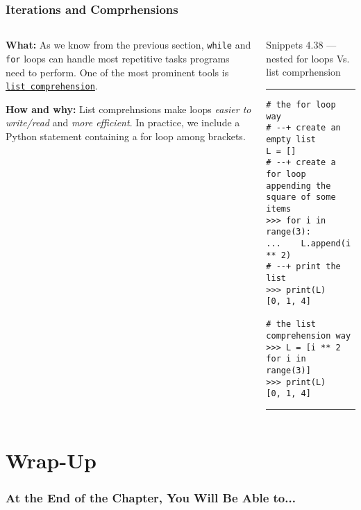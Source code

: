 \documentclass[aspectratio=1610]{beamer}
\begin{document}
\begin{frame}[fragile]
    \frametitle{Iterations and Comprhensions}
        \begin{columns}
            \begin{column}{0.35\textwidth}
            \quad \textbf{What:} 
            As we know from the previous section, \texttt{while} and \texttt{for} loops can handle most repetitive tasks programs need to perform.  One of the most prominent tools is \href{https://docs.python.org/3/tutorial/datastructures.html}{\texttt{list comprehension}}.

            \vspace{1em}
        
            \quad \textbf{How and why:}
            List comprehnsions make loops \emph{easier to write/read} and \emph{more efficient}. In practice, we include a Python statement containing a for loop among brackets.
            \end{column}
            \begin{column}{0.55\textwidth}
            Snippets 4.38 --- nested for loops Vs. list comprhension
            \rule{\textwidth}{1pt}
                \scriptsize
                \begin{verbatim} 
# the for loop way
# --+ create an empty list
L = []
# --+ create a for loop appending the square of some items
>>> for i in range(3):
...    L.append(i ** 2)
# --+ print the list
>>> print(L)
[0, 1, 4]

# the list comprehension way
>>> L = [i ** 2 for i in range(3)]
>>> print(L)
[0, 1, 4]
               \end{verbatim}
           \rule{\textwidth}{1pt}
           \end{column}
    \end{columns}
\end{frame}

\section{Wrap-Up}

\begin{frame}
    \frametitle{At the End of the Chapter, You Will Be Able to...}
\end{frame}
\end{document}

